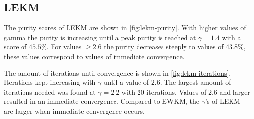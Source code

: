 \documentclass[../report.tex]{subfiles}
\begin{document}




\subsection{LEKM}
The purity scores of LEKM are shown in \cref{fig:lekm-purity}. With higher values of gamma the purity is increasing until a peak purity is reached at $\gamma = 1.4$ with a score of $45.5\%$. For values $\geq 2.6$ the purity decreases steeply to values of $43.8\%$, these values correspond to values of immediate convergence.

The amount of iterations until convergence is shown in \cref{fig:lekm-iterations}. Iterations kept increasing with $\gamma$ until a value of $2.6$. The largest amount of iterations needed was found at $\gamma=2.2$ with 20 iterations. Values of $2.6$ and larger resulted in an immediate convergence. Compared to EWKM, the $\gamma$'s of LEKM are larger when immediate convergence occurs.


\end{document}
